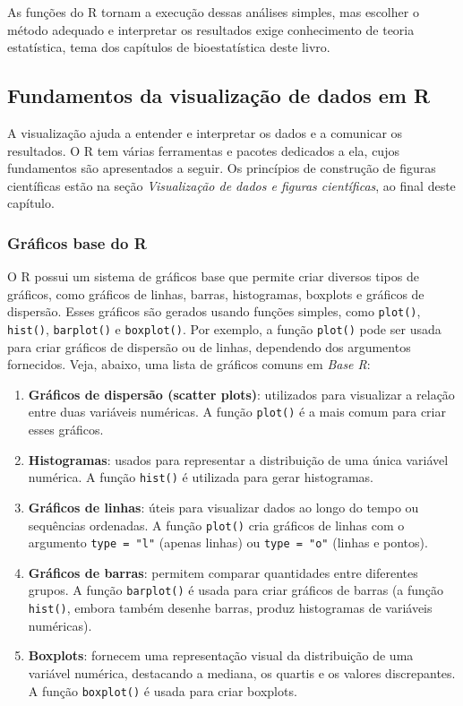 \documentclass[
]{book}
\begin{document}
As funções do R tornam a execução dessas análises simples, mas escolher o método adequado e interpretar os resultados exige conhecimento de teoria estatística, tema dos capítulos de bioestatística deste livro.

\subsection{Fundamentos da visualização de dados em R}\label{fundamentos-da-visualizauxe7uxe3o-de-dados-em-r}

A visualização ajuda a entender e interpretar os dados e a comunicar os resultados. O R tem várias ferramentas e pacotes dedicados a ela, cujos fundamentos são apresentados a seguir. Os princípios de construção de figuras científicas estão na seção \emph{Visualização de dados e figuras científicas}, ao final deste capítulo.

\subsubsection{Gráficos base do R}\label{gruxe1ficos-base-do-r}

O R possui um sistema de gráficos base que permite criar diversos tipos de gráficos, como gráficos de linhas, barras, histogramas, boxplots e gráficos de dispersão. Esses gráficos são gerados usando funções simples, como \texttt{plot()}, \texttt{hist()}, \texttt{barplot()} e \texttt{boxplot()}. Por exemplo, a função \texttt{plot()} pode ser usada para criar gráficos de dispersão ou de linhas, dependendo dos argumentos fornecidos. Veja, abaixo, uma lista de gráficos comuns em \emph{Base R}:

\begin{enumerate}
\def\labelenumi{\arabic{enumi}.}
\item
  \textbf{Gráficos de dispersão (scatter plots)}: utilizados para visualizar a relação entre duas variáveis numéricas. A função \texttt{plot()} é a mais comum para criar esses gráficos.
\item
  \textbf{Histogramas}: usados para representar a distribuição de uma única variável numérica. A função \texttt{hist()} é utilizada para gerar histogramas.
\item
  \textbf{Gráficos de linhas}: úteis para visualizar dados ao longo do tempo ou sequências ordenadas. A função \texttt{plot()} cria gráficos de linhas com o argumento \texttt{type\ =\ "l"} (apenas linhas) ou \texttt{type\ =\ "o"} (linhas e pontos).
\item
  \textbf{Gráficos de barras}: permitem comparar quantidades entre diferentes grupos. A função \texttt{barplot()} é usada para criar gráficos de barras (a função \texttt{hist()}, embora também desenhe barras, produz histogramas de variáveis numéricas).
\item
  \textbf{Boxplots}: fornecem uma representação visual da distribuição de uma variável numérica, destacando a mediana, os quartis e os valores discrepantes. A função \texttt{boxplot()} é usada para criar boxplots.
\end{enumerate}
\end{document}
